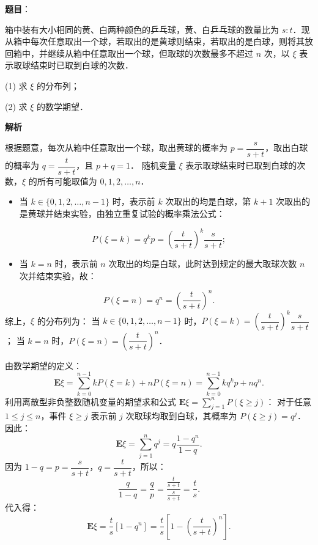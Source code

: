 \begin{answer}

\textbf{题目}：

箱中装有大小相同的黄、白两种颜色的乒乓球，黄、白乒乓球的数量比为 $s : t$．现从箱中每次任意取出一个球，若取出的是黄球则结束，若取出的是白球，则将其放回箱中，并继续从箱中任意取出一个球，但取球的次数最多不超过 $n$ 次，以 $\xi$ 表示取球结束时已取到白球的次数．

(1) 求 $\xi$ 的分布列；

(2) 求 $\xi$ 的数学期望．

\textbf{解析}

根据题意，每次从箱中任意取出一个球，取出黄球的概率为 $p = \dfrac{s}{s + t}$，取出白球的概率为 $q = \dfrac{t}{s + t}$，且 $p + q = 1$．
随机变量 $\xi$ 表示取球结束时已取到白球的次数，$\xi$ 的所有可能取值为 $0, 1, 2, \dots, n$．


\begin{itemize}
\item 当 $k \in \{0, 1, 2, \dots, n-1\}$ 时，表示前 $k$ 次取出的均是白球，第 $k+1$ 次取出的是黄球并结束实验，由独立重复试验的概率乘法公式：
\end{itemize}
\nopagebreak[4]
\[
P(\xi = k) = q^k p = \left(\frac{t}{s+t}\right)^k \frac{s}{s+t};
\]
\begin{itemize}
\item 当 $k = n$ 时，表示前 $n$ 次取出的均是白球，此时达到规定的最大取球次数 $n$ 次并结束实验，故：
\end{itemize}
\nopagebreak[4]
\[
P(\xi = n) = q^n = \left(\frac{t}{s+t}\right)^n.
\]
综上，$\xi$ 的分布列为：
当 $k \in \{0, 1, 2, \dots, n-1\}$ 时，$P(\xi = k) = \left(\dfrac{t}{s+t}\right)^k \dfrac{s}{s+t}$；
当 $k = n$ 时，$P(\xi = n) = \left(\dfrac{t}{s+t}\right)^n$．


由数学期望的定义：
\nopagebreak[4]
\[
\mathbf{E}\xi = \sum_{k=0}^{n-1} k P(\xi = k) + n P(\xi = n) = \sum_{k=0}^{n-1} k q^k p + n q^n.
\]
利用离散型非负整数随机变量的期望求和公式 $\mathbf{E}\xi = \sum_{j=1}^n P(\xi \geqslant j)$：
对于任意 $1 \leqslant j \leqslant n$，事件 $\xi \geqslant j$ 表示前 $j$ 次取球均取到白球，其概率为 $P(\xi \geqslant j) = q^j$．
因此：
\nopagebreak[4]
\[
\mathbf{E}\xi = \sum_{j=1}^n q^j = q \frac{1 - q^n}{1 - q}.
\]
因为 $1 - q = p = \dfrac{s}{s + t}$，$q = \dfrac{t}{s + t}$，所以：
\nopagebreak[4]
\[
\frac{q}{1 - q} = \frac{q}{p} = \frac{\frac{t}{s+t}}{\frac{s}{s+t}} = \frac{t}{s}.
\]
代入得：
\nopagebreak[4]
\[
\mathbf{E}\xi = \frac{t}{s}\left[1 - q^n\right] = \frac{t}{s}\left[1 - \left(\frac{t}{s+t}\right)^n\right].
\]



\end{answer}
